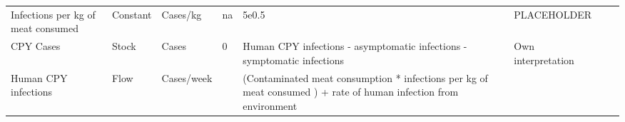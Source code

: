 \begin{landscape}
\begin{longtable}[c]{m{10em}lllm{15em}lll}
Infections per kg of meat consumed            & Constant & Cases/kg                 & na                        & 5e0.5                                                                                                                                                                                                                                                                                    & PLACEHOLDER                                                                                                                                                                                  &                                                                                                                                                                                                                                       \\
CPY Cases                                     & Stock    & Cases                    & 0                         & Human CPY infections - asymptomatic infections - symptomatic infections                                                                                                                                                                                                                  & Own interpretation                                                                                                                                                                           &                                                                                                                                                                                                                                       \\
Human CPY infections                          & Flow     & Cases/week               &                           & (Contaminated meat consumption * infections per kg of meat consumed ) + rate of human infection from environment                                                                                                                                                                         &                                                                                                                                                                                              &                                                                                                                                                                                                                                       \\

\end{longtable}
\end{landscape}
